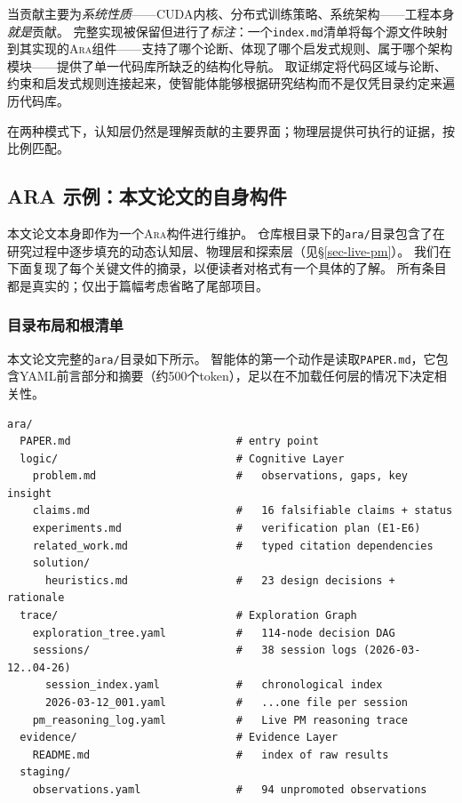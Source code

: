 \documentclass[
]{article}
\newcommand{\passthrough}[1]{#1}
\theoremstyle{definition}
\newcommand{\ara}{\textsc{Ara}}
\begin{document}
当贡献主要为\emph{系统性质}------CUDA内核、分布式训练策略、系统架构------工程本身\emph{就是}贡献。
完整实现被保留但进行了\emph{标注}：一个\passthrough{\lstinline!index.md!}清单将每个源文件映射到其实现的\ara{}组件------支持了哪个论断、体现了哪个启发式规则、属于哪个架构模块------提供了单一代码库所缺乏的结构化导航。
取证绑定将代码区域与论断、约束和启发式规则连接起来，使智能体能够根据研究结构而不是仅凭目录约定来遍历代码库。

在两种模式下，认知层仍然是理解贡献的主要界面；物理层提供可执行的证据，按比例匹配。

\subsection{ARA 示例：本文论文的自身构件}\label{sec-app-schema}

本文论文本身即作为一个\ara{}构件进行维护。
仓库根目录下的\passthrough{\lstinline!ara/!}目录包含了在研究过程中逐步填充的动态认知层、物理层和探索层（见\S\ref{sec-live-pm}）。
我们在下面复现了每个关键文件的摘录，以便读者对格式有一个具体的了解。
所有条目都是真实的；仅出于篇幅考虑省略了尾部项目。

\subsubsection{目录布局和根清单}\label{ux76eeux5f55ux5e03ux5c40ux548cux6839ux6e05ux5355}

本文论文完整的\passthrough{\lstinline!ara/!}目录如下所示。
智能体的第一个动作是读取\passthrough{\lstinline!PAPER.md!}，它包含YAML前言部分和摘要（约500个token），足以在不加载任何层的情况下决定相关性。

\begin{lstlisting}
ara/
  PAPER.md                          # entry point
  logic/                            # Cognitive Layer
    problem.md                      #   observations, gaps, key insight
    claims.md                       #   16 falsifiable claims + status
    experiments.md                  #   verification plan (E1-E6)
    related_work.md                 #   typed citation dependencies
    solution/
      heuristics.md                 #   23 design decisions + rationale
  trace/                            # Exploration Graph
    exploration_tree.yaml           #   114-node decision DAG
    sessions/                       #   38 session logs (2026-03-12..04-26)
      session_index.yaml            #   chronological index
      2026-03-12_001.yaml           #   ...one file per session
    pm_reasoning_log.yaml           #   Live PM reasoning trace
  evidence/                         # Evidence Layer
    README.md                       #   index of raw results
  staging/
    observations.yaml               #   94 unpromoted observations
\end{lstlisting}
\end{document}
